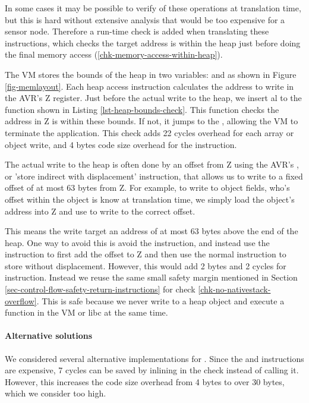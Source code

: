 In some cases it may be possible to verify of these operations at translation time, but this is hard without extensive analysis that would be too expensive for a sensor node. Therefore a run-time check is added when translating these instructions, which checks the target address is within the heap just before doing the final memory access (\ref{chk-memory-access-within-heap}).

The VM stores the bounds of the heap in two variables:  and  as shown in Figure \ref{fig-memlayout}. Each heap access instruction calculates the address to write in the AVR's Z register. Just before the actual write to the heap, we insert al  to the  function shown in Listing \ref{lst-heap-bounds-check}. This function checks the address in Z is within these bounds. If not, it jumps to the , allowing the VM to terminate the application. This check adds 22 cycles overhead for each array or object write, and 4 bytes code size overhead for the  instruction.

The actual write to the heap is often done by an offset from Z using the AVR's , or 'store indirect with displacement' instruction, that allows us to write to a fixed offset of at most 63 bytes from Z. For example, to write to object fields, who's offset within the object is know at translation time, we simply load the object's address into Z and use  to write to the correct offset.

This means the write target an address of at most 63 bytes above the end of the heap. One way to avoid this is avoid the  instruction, and instead use the  instruction to first add the offset to Z and then use the normal  instruction to store without displacement. However, this would add 2 bytes and 2 cycles for instruction. Instead we reuse the same small safety margin mentioned in Section \ref{sec-control-flow-safety-return-instructions} for check \ref{chk-no-nativestack-overflow}. This is safe because we never write to a heap object and execute a function in the VM or libc at the same time.

\paragraph{Alternative solutions}
We considered several alternative implementations for . Since the  and  instructions are expensive, 7 cycles can be saved by inlining in the check instead of calling it. However, this increases the code size overhead from 4 bytes to over 30 bytes, which we consider too high.

